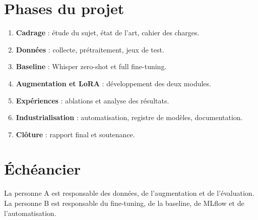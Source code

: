 \documentclass[12pt,a4paper]{report}
\begin{document}
\section{Phases du projet}
\begin{enumerate}
  \item \textbf{Cadrage} : étude du sujet, état de l'art, cahier des charges.
  \item \textbf{Données} : collecte, prétraitement, jeux de test.
  \item \textbf{Baseline} : Whisper zero-shot et full fine-tuning.
  \item \textbf{Augmentation et LoRA} : développement des deux modules.
  \item \textbf{Expériences} : ablations et analyse des résultats.
  \item \textbf{Industrialisation} : automatisation, registre de modèles,
        documentation.
  \item \textbf{Clôture} : rapport final et soutenance.
\end{enumerate}

\section{Échéancier}
La personne A est responsable des données, de l'augmentation et de l'évaluation.
La personne B est responsable du fine-tuning, de la baseline, de MLflow et de
l'automatisation.
\end{document}
